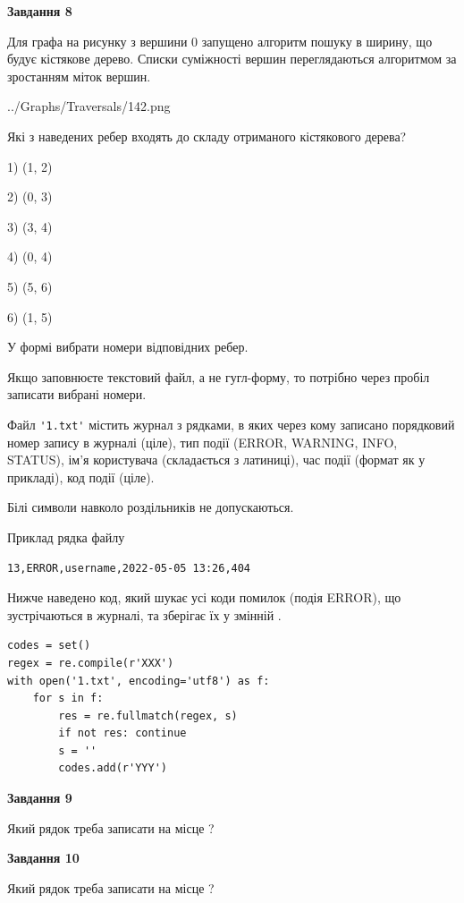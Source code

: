 \documentclass[12pt, ukrainian]{article}
\def\code#1{\Verb!#1!}
\begin{document}
{\begin {large}
{\begin {center}\textbf{Завдання 8}\end {center}}\par
Для графа на рисунку з вершини 0 запущено алгоритм пошуку в ширину, що будує кістякове дерево. Списки суміжності вершин переглядаються алгоритмом за зростанням міток вершин.\par
\begin{center}
	{../Graphs/Traversals/142.png}
\end{center}
\par Які з наведених ребер входять до складу отриманого кістякового дерева?\par
1) (1, 2)\par
2) (0, 3)\par
3) (3, 4)\par
4) (0, 4)\par
5) (5, 6)\par
6) (1, 5)\par
{\vskip 15pt} У формі вибрати номери відповідних ребер.


Якщо заповнюєте текстовий файл, а не гугл-форму, то потрібно через пробіл записа\-ти вибрані номери.\par
\newpage


Файл \code{'1.txt'} містить журнал з рядками, в яких через кому записано поряд\-ко\-вий номер запису в журналі (ціле), тип події (ERROR, WARNING, INFO, STATUS), ім'я користувача (складається з латиниці), час події (фор\-мат як у прикладі), код події (ціле).

Білі символи навколо роздільників не допускаються.

Приклад рядка файлу



\begin{verbatim}
13,ERROR,username,2022-05-05 13:26,404
\end{verbatim}


Нижче наведено код, який шукає усі коди помилок (подія ERROR), що зустріча\-ють\-ся в журналі, та зберігає їх у змінній .



\begin{verbatim}
codes = set()
regex = re.compile(r'XXX')
with open('1.txt', encoding='utf8') as f:
    for s in f:
        res = re.fullmatch(regex, s)
        if not res: continue
        s = ''
        codes.add(r'YYY')
\end{verbatim}


{\begin {center}\textbf{Завдання 9}\end {center}}\par
Який рядок треба записати на місце  ?\par
\vspace{5mm}


{\begin {center}\textbf{Завдання 10}\end {center}}\par
Який рядок треба записати на місце  ?\par


\newpage


\end {large}}
\end{document}

